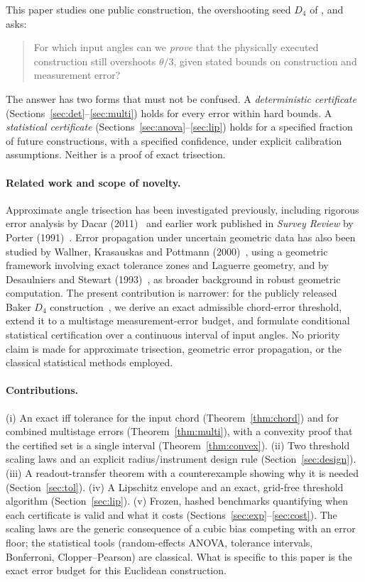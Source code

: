 \documentclass[11pt]{article}
\theoremstyle{definition}
\newcommand{\Dfour}{D_4}
\begin{document}
This paper studies one public construction, the overshooting seed $\Dfour$ of \cite{bakerrepo}, and asks:
\begin{quote}
For which input angles can we \emph{prove} that the physically executed construction still overshoots $\theta/3$, given stated bounds on construction and measurement error?
\end{quote}
The answer has two forms that must not be confused.
A \emph{deterministic certificate} (Sections~\ref{sec:det}--\ref{sec:multi}) holds for every error within hard bounds.
A \emph{statistical certificate} (Sections~\ref{sec:anova}--\ref{sec:lip}) holds for a specified fraction of future constructions, with a specified confidence, under explicit calibration assumptions.
Neither is a proof of exact trisection.

\paragraph{Related work and scope of novelty.}
Approximate angle trisection has been investigated previously, including rigorous error analysis by Dacar (2011)~\cite{dacar2011} and earlier work published in \emph{Survey Review} by Porter (1991)~\cite{porter1991}.
Error propagation under uncertain geometric data has also been studied by Wallner, Krasauskas and Pottmann (2000)~\cite{wallner2000}, using a geometric framework involving exact tolerance zones and Laguerre geometry, and by Desaulniers and Stewart (1993)~\cite{desaulniers1993}, as broader background in robust geometric computation.
The present contribution is narrower: for the publicly released Baker $D_4$ construction~\cite{bakerrepo}, we derive an exact admissible chord-error threshold, extend it to a multistage measurement-error budget, and formulate conditional statistical certification over a continuous interval of input angles.
No priority claim is made for approximate trisection, geometric error propagation, or the classical statistical methods employed.

\paragraph{Contributions.}
(i) An exact iff tolerance for the input chord (Theorem~\ref{thm:chord}) and for combined multistage errors (Theorem~\ref{thm:multi}), with a convexity proof that the certified set is a single interval (Theorem~\ref{thm:convex}).
(ii) Two threshold scaling laws and an explicit radius/instrument design rule (Section~\ref{sec:design}).
(iii) A readout-transfer theorem with a counterexample showing why it is needed (Section~\ref{sec:tol}).
(iv) A Lipschitz envelope and an exact, grid-free threshold algorithm (Section~\ref{sec:lip}).
(v) Frozen, hashed benchmarks quantifying when each certificate is valid and what it costs (Sections~\ref{sec:exp}--\ref{sec:cost}).
The scaling laws are the generic consequence of a cubic bias competing with an error floor; the statistical tools (random-effects ANOVA, tolerance intervals, Bonferroni, Clopper--Pearson) are classical.
What is specific to this paper is the exact error budget for this Euclidean construction.
\end{document}
